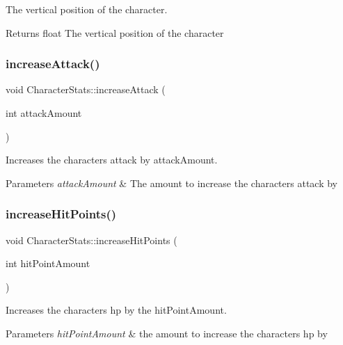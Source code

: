 The vertical position of the character. 

\begin{DoxyReturn}{Returns}
float The vertical position of the character 
\end{DoxyReturn}
\mbox{\label{classCharacterStats_a5e9d5271f98b21c335cef1b3efe3ef2c}} 
\subsubsection{\texorpdfstring{increaseAttack()}{increaseAttack()}}
{\footnotesize\ttfamily void Character\+Stats\+::increase\+Attack (\begin{DoxyParamCaption}\item[{int}]{attack\+Amount }\end{DoxyParamCaption})}



Increases the characters attack by attack\+Amount. 


\begin{DoxyParams}{Parameters}
{\em attack\+Amount} & The amount to increase the characters attack by \\
\hline
\end{DoxyParams}
\mbox{\label{classCharacterStats_a82b3b7fe66687a1210a8ea4c28d86738}} 
\subsubsection{\texorpdfstring{increaseHitPoints()}{increaseHitPoints()}}
{\footnotesize\ttfamily void Character\+Stats\+::increase\+Hit\+Points (\begin{DoxyParamCaption}\item[{int}]{hit\+Point\+Amount }\end{DoxyParamCaption})}



Increases the characters hp by the hit\+Point\+Amount. 


\begin{DoxyParams}{Parameters}
{\em hit\+Point\+Amount} & the amount to increase the characters hp by \\
\hline
\end{DoxyParams}
\mbox{\label{classCharacterStats_aa596a2a54f57b7a637d7be5be50433bb}} 
